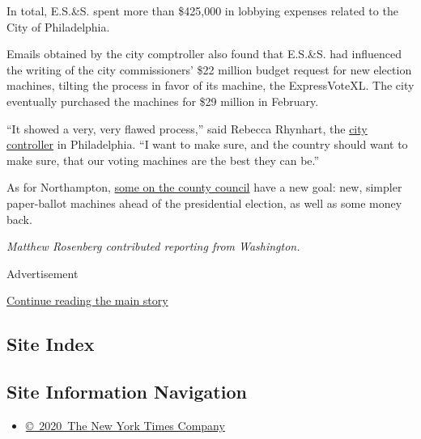 In total, E.S.\&S. spent more than \$425,000 in lobbying expenses
related to the City of Philadelphia.

Emails obtained by the city comptroller also found that E.S.\&S. had
influenced the writing of the city commissioners' \$22 million budget
request for new election machines, tilting the process in favor of its
machine, the ExpressVoteXL. The city eventually purchased the machines
for \$29 million in February.

``It showed a very, very flawed process,'' said Rebecca Rhynhart, the
\href{https://controller.phila.gov/}{city controller} in Philadelphia.
``I want to make sure, and the country should want to make sure, that
our voting machines are the best they can be.''

As for Northampton,
\href{https://www.wfmz.com/features/think-tank/northampton-county-voting-machine-accuracy-and-reliability/article_87dfa09a-0fa8-11ea-8acb-87da637467b7.html}{some
on the county council} have a new goal: new, simpler paper-ballot
machines ahead of the presidential election, as well as some money back.

\emph{Matthew Rosenberg contributed reporting from Washington.}

Advertisement

\protect\hyperlink{after-bottom}{Continue reading the main story}

\hypertarget{site-index}{%
\subsection{Site Index}\label{site-index}}

\hypertarget{site-information-navigation}{%
\subsection{Site Information
Navigation}\label{site-information-navigation}}

\begin{itemize}
\tightlist
\item
  \href{https://help.nytimes3xbfgragh.onion/hc/en-us/articles/115014792127-Copyright-notice}{©~2020~The
  New York Times Company}
\end{itemize}


